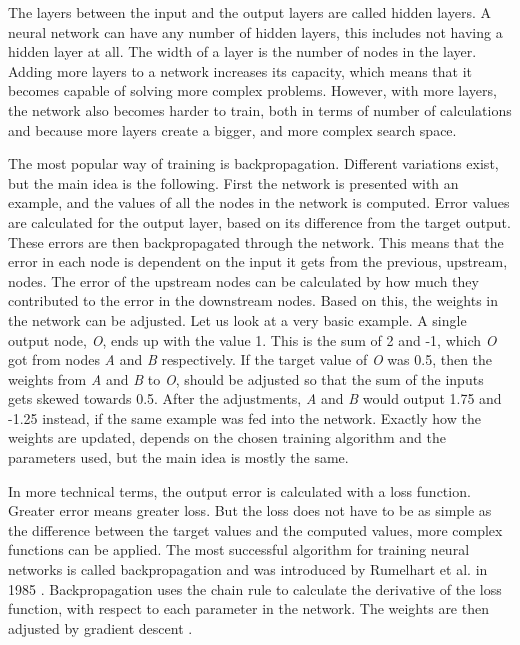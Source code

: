 The layers between the input and the output layers are called hidden layers. A neural network can have any number of hidden layers, this includes not having a hidden layer at all. The width of a layer is the number of nodes in the layer. Adding more layers to a network increases its capacity, which means that it becomes capable of solving more complex problems. However, with more layers, the network also becomes harder to train, both in terms of number of calculations and because more layers create a bigger, and more complex search space.

The most popular way of training is backpropagation. Different variations exist, but the main idea is the following. First the network is presented with an example, and the values of all the nodes in the network is computed. Error values are calculated for the output layer, based on its difference from the target output. These errors are then backpropagated through the network. This means that the error in each node is dependent on the input it gets from the previous, upstream, nodes. The error of the upstream nodes can be calculated by how much they contributed to the error in the downstream nodes. Based on this, the weights in the network can be adjusted. Let us look at a very basic example. A single output node, \textit{O}, ends up with the value 1. This is the sum of 2 and -1, which \textit{O} got from nodes \textit{A} and \textit{B} respectively. If the target value of \textit{O} was 0.5, then the weights from \textit{A} and \textit{B} to \textit{O}, should be adjusted so that the sum of the inputs gets skewed towards 0.5. After the adjustments, \textit{A} and \textit{B} would output 1.75 and -1.25 instead, if the same example was fed into the network. Exactly how the weights are updated, depends on the chosen training algorithm and the parameters used, but the main idea is mostly the same.

In more technical terms, the output error is calculated with a loss function. Greater error means greater loss. But the loss does not have to be as simple as the difference between the target values and the computed values, more complex functions can be applied. The most successful algorithm for training neural networks is called backpropagation and was introduced by Rumelhart et al. in 1985 \cite{DBLP:journals/corr/Lipton15} \cite{Rumelhart:1986:LIR:104279.104293}. Backpropagation uses the chain rule to calculate the derivative of the loss function, with respect to each parameter in the network. The weights are then adjusted by gradient descent \cite{DBLP:journals/corr/Lipton15}.

